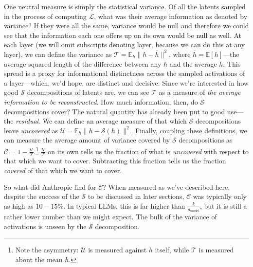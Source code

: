 \documentclass{article}
\newcommand{\jlens}{\mathscr{L}}
\newcommand{\jspace}{\mathscr{S}}
\newcommand{\dmodel}{d_{\text{model}}}
\begin{document}
One neutral measure is simply the statistical variance. Of all the latents sampled in the process of computing \(\jlens\), what was their average information as denoted by variance? If they were all the same, variance would be null and therefore we could see that the information each one offers up on its own would be null as well. At each layer (we will omit subscripts denoting layer, because we can do this at any layer), we can define the variance as \(\mathscr{T} = \mathbb{E}_h\|h - \bar{h}\|^2\), where \(\bar{h} = \mathbb{E} [h]\)---the average squared length of the difference between any \(h\) and the average \(h\). This spread is a proxy for informational distinctness across the sampled activations of a layer---which, we'd hope, are distinct and decisive. Since we're interested in how good \(\jspace\) decompositions of latents are, we can see \(\mathscr{T}\) as a measure of \textit{the average information to be reconstructed}. How much information, then, do \(\jspace\) decompositions cover? The natural quantity has already been put to good use---the \textit{residual}. We can define an average measure of that which \(\jspace\) decompositions leave \textit{uncovered} as \(\mathscr{U} = \mathbb{E}_h\|h - \jspace(h)\|^2\). Finally, coupling these definitions, we can measure the average amount of variance covered by \(\jspace\) decompositions as \(\mathscr{C} = 1 - \frac{\mathscr{U}}{\mathscr{T}}\).\footnote{Note the asymmetry: \(\mathscr{U}\) is measured against \(h\) itself, while \(\mathscr{T}\) is measured about the mean \(\bar{h}\).}
 \(\frac{\mathscr{U}}{\mathscr{T}}\) on its own tells us the fraction of what is \textit{uncovered} with respect to that which we want to cover. Subtracting this fraction tells us the fraction \textit{covered} of that which we want to cover. 

So what did Anthropic find for \(\mathscr{C}\)? When measured as we've described here, despite the success of the \(\jspace\) to be discussed in later sections, \(\mathscr{C}\) was typically only as high as \(10-15\%\). In typical LLMs, this is far higher than \(\frac{k}{\dmodel}\), but it is still a rather lower number than we might expect. The bulk of the variance of activations is unseen by the \(\jspace\) decomposition.
\end{document}

